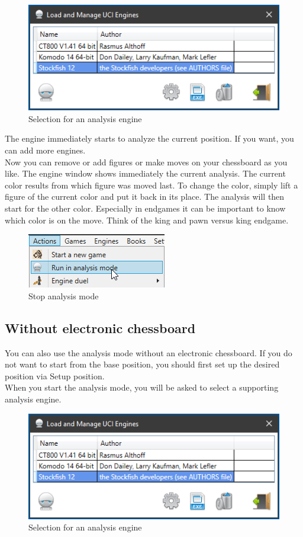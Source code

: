 \documentclass[11pt,a4paper]{article}
\begin{document}
\begin{figure}[H]
	\centering
	\includegraphics[scale=0.9]{AnalyzeMode2.png}
	\caption{Selection for an analysis engine}
	\label{fig:AnalyzeMode2}
\end{figure}

The engine immediately starts to analyze the current position. If you want, you can add more engines.\\
Now you can remove or add figures or make moves on your chessboard as you like. The engine window shows immediately the current analysis. The current color results from which figure was moved last. To change the color, simply lift a figure of the current color and put it back in its place. The analysis will then start for the other color. Especially in endgames it can be important to know which color is on the move. Think of the king and pawn versus king endgame.

\begin{figure}[H]
	\centering
	\includegraphics[scale=1.0]{AnalyzeMode3.png}
	\caption{Stop analysis mode}
	\label{fig:AnalyzeMode3}
\end{figure}

\subsection{Without electronic chessboard}
You can also use the analysis mode without an electronic chessboard. If you do not want to start from the base position, you should first set up the desired position via Setup position.\\
When you start the analysis mode, you will be asked to select a supporting analysis engine.

\begin{figure}[H]
	\centering
	\includegraphics[scale=0.9]{AnalyzeMode2.png}
	\caption{Selection for an analysis engine}
	\label{fig:AnalyzeMode2_2}
\end{figure}
\end{document}
